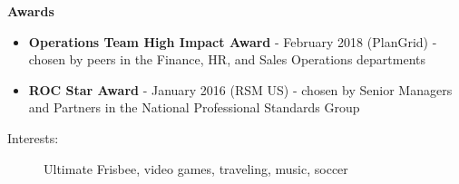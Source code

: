 \documentclass[10pt]{article}
\begin{document}
  {\large \textbf{Awards}}
  \begin{itemize}
    \item  \textbf{Operations Team High Impact Award} - February 2018 (PlanGrid) - chosen by peers in the Finance, HR, and Sales Operations departments
    \item \textbf{ROC Star Award} - January 2016 (RSM US) - chosen by Senior Managers and Partners in the National Professional Standards Group
  \end{itemize}

  \begin{description}

    \item[Interests:]
Ultimate Frisbee, video games, traveling, music, soccer

  \end{description}
\end{document}
